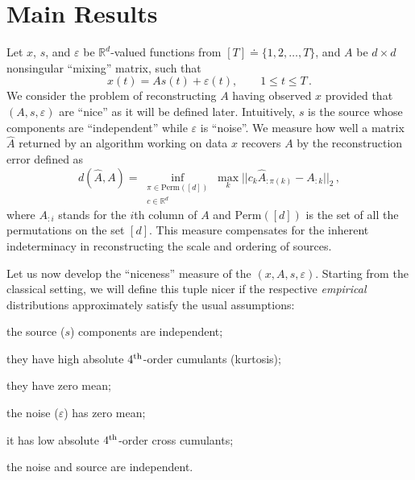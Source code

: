\documentclass{article} %
\newcommand{\real}{\mathbb{R}}
\newcommand{\eps}{\epsilon}
\renewcommand{\epsilon}{\varepsilon}
\theoremstyle{definition}
\begin{document}
\section{Main Results}
\label{sec:main}
Let $x$, $s$, and $\epsilon$ be $\real^d$-valued functions from $[T]\doteq\{1,2,\ldots,T\}$, and $A$ be $d\times d$ nonsingular ``mixing'' matrix, such that 
\begin{equation}
\label{eq:ICA}
x(t) = As(t)+\epsilon(t), \qquad 1\le t\le T\,.
\end{equation}
We consider the problem of reconstructing $A$ having observed $x$ provided that $(A,s,\epsilon)$ are ``nice'' as it will be defined later. Intuitively, $s$ is the source whose components are ``independent'' while $\epsilon$ is ``noise''.
We measure how well a matrix $\hat{A}$ returned by an algorithm working on data $x$ 
recovers $A$ by the reconstruction error defined as
\[
d(\hat{A}, A) = \inf_{
		\substack{\pi \in \mathrm{Perm}([d]) \\ c\in \real^d}} 
		\max_{k} || c_k \hat{A}_{:\pi(k)} - A_{:k} ||_2\,,
\]
where $A_{:i}$ stands for the $i$th column of $A$ and
$\mathrm{Perm}([d])$ is the set of all the permutations on the set $[d]$.
This measure compensates for the inherent indeterminacy in reconstructing the scale and ordering of sources.

Let us now develop the ``niceness'' measure of the $(x,A,s,\eps)$. 
Starting from the classical setting, we will define this tuple nicer if the respective \emph{empirical} 
distributions approximately satisfy the usual assumptions: 
\begin{inparaenum}
\item the source ($s$) components are independent;
\item they have high absolute $4^{\rm th}$-order cumulants (kurtosis);
\item they have zero mean;
\item the noise ($\eps$) has  zero mean;
\item it has low absolute $4^{\rm th}$-order cross cumulants;
\item the noise and source are independent.
\end{inparaenum}
\end{document}
